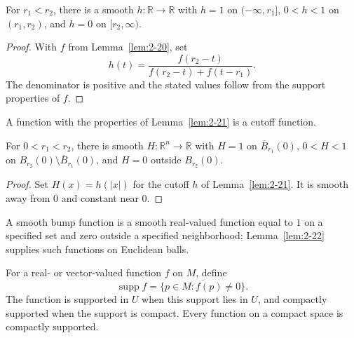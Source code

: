 \begin{lemma}
\label{lem:2-21}





For $r_1<r_2$, there is a smooth $h:\mathbb R\to\mathbb R$ with $h=1$ on $(-\infty,r_1]$, $0<h<1$ on $(r_1,r_2)$, and $h=0$ on $[r_2,\infty)$.
\end{lemma}

\begin{proof}

\sketch With $f$ from Lemma~\ref{lem:2-20}, set
\[
h(t)=\frac{f(r_2-t)}{f(r_2-t)+f(t-r_1)}.
\]
The denominator is positive and the stated values follow from the support properties of $f$.
\end{proof}

\begin{definition}
\label{def:2-10-extra-1}





A function with the properties of Lemma~\ref{lem:2-21} is a cutoff function.
\end{definition}

\begin{lemma}
\label{lem:2-22}





For $0<r_1<r_2$, there is smooth $H:\mathbb R^n\to\mathbb R$ with $H=1$ on $\overline B_{r_1}(0)$, $0<H<1$ on $B_{r_2}(0)\setminus\overline B_{r_1}(0)$, and $H=0$ outside $B_{r_2}(0)$.
\end{lemma}

\begin{proof}

\sketch Set $H(x)=h(|x|)$ for the cutoff $h$ of Lemma~\ref{lem:2-21}. It is smooth away from $0$ and constant near $0$.
\end{proof}

\begin{definition}
\label{def:2-10-extra-2}




A smooth bump function is a smooth real-valued function equal to $1$ on a specified set and zero outside a specified neighborhood; Lemma~\ref{lem:2-22} supplies such functions on Euclidean balls.
\end{definition}

\begin{definition}
\label{def:2-10-extra-3}



For a real- or vector-valued function $f$ on $M$, define
\[
\operatorname{supp}f=\overline{\{p\in M:f(p)\neq0\}}.
\]
The function is supported in $U$ when this support lies in $U$, and compactly supported when the support is compact. Every function on a compact space is compactly supported.
\end{definition}

